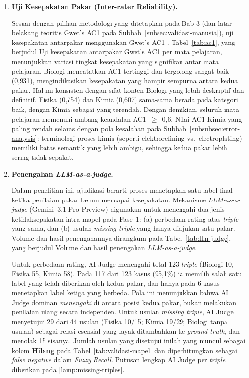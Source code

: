 \documentclass[../../thesis]{subfiles}
\begin{document}
\begin{enumerate}
  \item \textbf{Uji Kesepakatan Pakar (Inter-rater Reliability).}

  Sesuai dengan pilihan metodologi yang ditetapkan pada Bab 3 (dan latar belakang
  teoritis Gwet's AC1 pada Subbab~\ref{subsec:validasi-manusia}), uji kesepakatan antarpakar menggunakan
  Gwet's AC1 \parencite{gwet_handbook_2014}. Tabel~\ref{tab:ac1}, yang
  berjudul Uji kesepakatan antarpakar Gwet's AC1 per mata pelajaran,
  menunjukkan variasi tingkat kesepakatan
  yang signifikan antar mata pelajaran. Biologi mencatatkan AC1 tertinggi dan
  tergolong sangat baik (0{,}931), mengindikasikan kesepakatan yang hampir
  sempurna antara kedua pakar. Hal ini konsisten dengan sifat konten Biologi
  yang lebih deskriptif dan definitif. Fisika (0{,}754) dan Kimia (0{,}607)
  sama-sama berada pada kategori baik, dengan Kimia sebagai yang terendah.
  Dengan demikian, seluruh mata pelajaran memenuhi ambang keandalan
  AC1~$\geq$~0{,}6.
  Nilai AC1 Kimia yang paling rendah selaras dengan pola kesalahan pada
  Subbab~\ref{subsubsec:error-analysis}: terminologi proses kimia (seperti elektrorefining vs.\
  electroplating) memiliki batas semantik yang lebih ambigu, sehingga kedua pakar
  lebih sering tidak sepakat.

  \item \textbf{Penengahan \textit{LLM-as-a-judge}.}

  Dalam penelitian ini, ajudikasi berarti proses menetapkan satu label final
  ketika penilaian pakar belum mencapai kesepakatan. Mekanisme
  \textit{LLM-as-a-judge} (Gemini~3.1 Pro Preview) digunakan untuk menengahi dua
  jenis ketidaksepakatan intra-mapel pada Fase~1: (a) perbedaan rating atas
  \textit{triple} yang sama, dan (b) usulan \textit{missing triple} yang hanya
  diajukan satu pakar.
  Volume dan hasil penengahannya dirangkum pada Tabel~\ref{tab:llm-judge}, yang
  berjudul Volume dan hasil penengahan \textit{LLM-as-a-judge}.

  Untuk perbedaan rating, AI Judge menengahi total 123 \textit{triple} (Biologi
  10, Fisika 55, Kimia 58). Pada 117 dari 123 kasus (95{,}1\%) ia memilih salah
  satu label yang telah diberikan oleh kedua pakar, dan hanya pada 6 kasus
  menetapkan label ketiga yang berbeda. Pola ini menunjukkan bahwa AI Judge
  dominan \emph{menengahi} di antara posisi kedua pakar, bukan melakukan
  penilaian ulang secara independen. Untuk usulan \textit{missing triple}, AI Judge
  menyetujui 29 dari 44 usulan (Fisika 10/15; Kimia 19/29; Biologi tanpa usulan)
  sebagai relasi esensial yang layak ditambahkan ke \textit{ground truth}, dan
  menolak 15 sisanya. Jumlah usulan yang disetujui inilah yang muncul sebagai
  kolom \textbf{Hilang} pada Tabel~\ref{tab:validasi-mapel} dan diperhitungkan
  sebagai \textit{false negative} dalam \textit{Fuzzy Recall}. Putusan lengkap
  AI Judge per \textit{triple} diberikan pada \ref{lamp:missing-triples}.


\end{enumerate}
\end{document}
